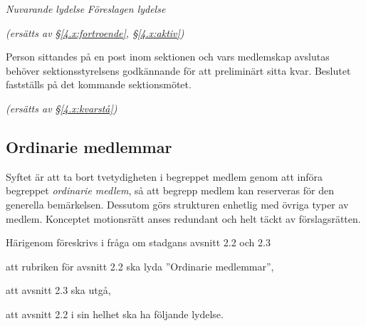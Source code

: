 \documentclass{article}
\newenvironment{lydelse}
    {\begin{paracol}{2}%
        \emph{Nuvarande lydelse}%
        \switchcolumn%
        \emph{Föreslagen lydelse}%
    \end{paracol}%
    \begin{enumerate}[label=\thesubsection.\arabic*]%
    \begin{paracol}{2}%
    }{\end{paracol}\end{enumerate}}
\begin{document}
\begin{lydelse}
  \switchcolumn
    \emph{(ersätts av \S \ref{4.x:fortroende}, \S \ref{4.x:aktiv})}

  \switchcolumn*
  \setcounter{subsection}{1}
  \setcounter{enumi}{1}
    \item Person sittandes på en post inom sektionen och vars medlemskap avslutas behöver sektionsstyrelsens godkännande för att preliminärt sitta kvar.
    Beslutet fastställs på det kommande sektionsmötet.

  \switchcolumn
    \emph{(ersätts av \S\ref{4.x:kvarstå})} %
\end{lydelse}

\subsection{Ordinarie medlemmar}
Syftet är att ta bort tvetydigheten i begreppet medlem genom att införa begreppet \emph{ordinarie medlem}, så att begrepp medlem kan reserveras för den generella bemärkelsen.
Dessutom görs strukturen enhetlig med övriga typer av medlem.
Konceptet motionsrätt anses redundant och helt täckt av förslagsrätten.

Härigenom föreskrivs i fråga om stadgans avsnitt 2.2 och 2.3
\begin{dels}
    \item att rubriken för avsnitt 2.2 ska lyda ''Ordinarie medlemmar'',
    \item att avsnitt 2.3 ska utgå,
    \item att avsnitt 2.2 i sin helhet ska ha följande lydelse.
\end{dels}
\end{document}
